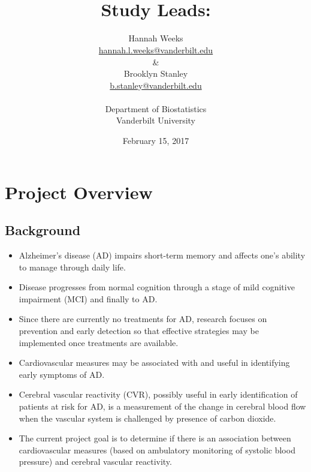 \documentclass[10pt]{article}\usepackage[]{graphicx}\usepackage[]{color}
\title{\projtitl\\ Study Leads: \studyLead}
\author{Hannah Weeks \\ \href{mailto:hannah.l.weeks@vanderbilt.edu}{\url{hannah.l.weeks@vanderbilt.edu}}\\ \& \\
Brooklyn Stanley  \\ \href{mailto:b.stanley@vanderbilt.edu}{\url{b.stanley@vanderbilt.edu}}
\\ \ \\ Department of Biostatistics \\ Vanderbilt University }
\date{February 15, 2017}
\newcommand{\projtitl}{MAP: ABP and CBF/CVR}
\begin{document}

\maketitle
\clearpage
\tableofcontents     
\clearpage












\clearpage
\section{Project Overview}

\subsection{Background}

\begin{itemize}
  \item Alzheimer's disease (AD) impairs short-term memory and affects one's ability to manage through daily life. 
  \item Disease progresses from normal cognition through a stage of mild cognitive impairment (MCI) and finally to AD. 
  \item Since there are currently no treatments for AD, research focuses on prevention and early detection so that effective strategies may be implemented once treatments are available.
  \item Cardiovascular measures may be associated with and useful in identifying early symptoms of AD.
  \item Cerebral vascular reactivity (CVR), possibly useful in early identification of patients at risk for AD, is a measurement of the change in cerebral blood flow when the vascular system is challenged by presence of carbon dioxide.
  \item The current project goal is to determine if there is an association between cardiovascular measures (based on ambulatory monitoring of systolic blood pressure) and cerebral vascular reactivity.
\end{itemize}
\end{document}
